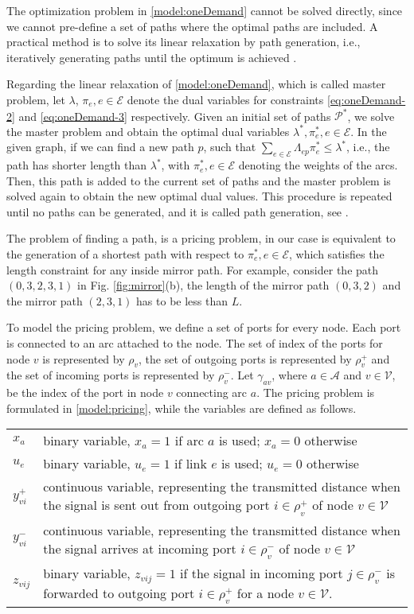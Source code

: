 \documentclass[onecolumn,11pt,draftclsnofoot]{IEEEtran}
\begin{document}
The optimization problem in \eqref{model:oneDemand} cannot be solved directly, since we cannot pre-define a set of paths where the optimal paths are included. A practical method is to solve its linear relaxation by path generation, i.e., iteratively generating paths until the optimum is achieved \cite{pioro2004}.

Regarding the linear relaxation of \eqref{model:oneDemand}, which is called master problem, let $\lambda$, $\pi_{e}, e \in \mathcal E$ denote the dual variables for constraints \eqref{eq:oneDemand-2} and \eqref{eq:oneDemand-3} respectively. Given an initial set of paths $\mathcal P^*$, we solve the master problem and obtain the optimal dual variables $\lambda^*, \pi_{e}^*, e \in \mathcal E$.
In the given graph, if we can find a new path $p$, such that $\sum_{e \in \mathcal E} \Lambda_{ep} \pi^*_{e} \leq \lambda^*$, i.e., the path has shorter length than $\lambda^*$, with $\pi^*_{e}, e \in \mathcal E$ denoting the weights of the arcs. Then, this path is added to the current set of paths and the master problem is solved again to obtain the new optimal dual values. This procedure is repeated until no paths can be generated, and it is called path generation, see \cite{pioro2004}.

The problem of finding a path, is a pricing problem, in our case is equivalent to the generation of a shortest path with respect to $\pi^*_{e}, e\in \mathcal E$, which satisfies the length constraint for any inside mirror path. For example, consider the path $(0,3,2,3,1)$ in Fig. \ref{fig:mirror}(b), the length of the mirror path $(0,3,2)$ and the mirror path $(2,3,1)$ has to be less than $L$.

To model the pricing problem, we define a set of ports for every node. Each port is connected to an arc attached to the node. The set of index of the ports for node $v$ is represented by $\rho_v$, the set of outgoing ports is represented by $\rho^+_v$ and the set of incoming ports is represented by $\rho^-_v$. Let $\gamma_{av}$, where $ a \in \mathcal A$ and $v \in \mathcal V$, be the index of the port in node $v$ connecting arc $a$. The pricing problem is formulated in \eqref{model:pricing}, while the variables are defined as follows.

\begin{tabular}{lp{16cm}}
$x_a$ & binary variable, $x_a=1$ if arc $a$ is used; $x_a=0$ otherwise\\
$u_e$ & binary variable, $u_e=1$ if link $e$ is used; $u_e=0$ otherwise\\
$y^+_{vi}$ & continuous variable, representing the transmitted distance when the signal is sent out from outgoing port $i \in \rho^+_v$ of node $v \in \mathcal V$\\
$y^-_{vi}$ & continuous variable, representing the transmitted distance when the signal arrives at incoming port $i \in \rho^-_v$ of node $v \in \mathcal V$\\
$z_{vij}$ & binary variable, $z_{vij}=1$ if the signal in incoming port $j \in \mathcal \rho^-_{v}$ is forwarded to outgoing port $i \in \mathcal \rho^+_{v}$ for a node $v \in \mathcal V$.\\
\end{tabular}
\end{document}
